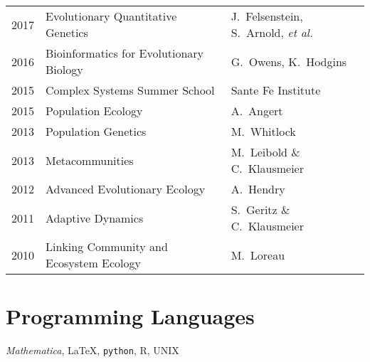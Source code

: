 \documentclass[12pt]{article}
\begin{document}
\begin{tabular}{lll}
2017 & Evolutionary Quantitative Genetics & J.\ Felsenstein, S.\ Arnold, \textit{et al.}\\
2016 & Bioinformatics for Evolutionary Biology & G.\ Owens, K.\ Hodgins\\
2015 & Complex Systems Summer School & Sante Fe Institute\\
2015 & Population Ecology & A.\ Angert\\
2013 & Population Genetics & M.\ Whitlock\\
2013 & Metacommunities & M.\ Leibold \& C.\ Klausmeier\\
2012 & Advanced Evolutionary Ecology & A.\ Hendry\\
2011 & Adaptive Dynamics & S.\ Geritz \& C.\ Klausmeier\\
2010 & Linking Community and Ecosystem Ecology & M.\ Loreau\\
\end{tabular}

\section*{Programming Languages}
\noindent \textit{Mathematica}, \LaTeX, \texttt{python}, \textsf{R}, UNIX 



\end{document}
